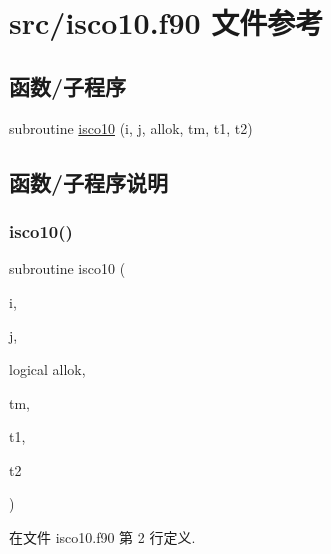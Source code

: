 \hypertarget{isco10_8f90}{}\section{src/isco10.f90 文件参考}
\label{isco10_8f90}
\subsection*{函数/子程序}
\begin{DoxyCompactItemize}
\item 
subroutine \mbox{\hyperlink{isco10_8f90_ab2c4215b937ff36383b5c718de25a706}{isco10}} (i, j, allok, tm, t1, t2)
\end{DoxyCompactItemize}


\subsection{函数/子程序说明}
\mbox{\label{isco10_8f90_ab2c4215b937ff36383b5c718de25a706}} 
\subsubsection{\texorpdfstring{isco10()}{isco10()}}
{\footnotesize\ttfamily subroutine isco10 (\begin{DoxyParamCaption}\item[{}]{i,  }\item[{}]{j,  }\item[{logical}]{allok,  }\item[{}]{tm,  }\item[{}]{t1,  }\item[{}]{t2 }\end{DoxyParamCaption})}



在文件 isco10.\+f90 第 2 行定义.

